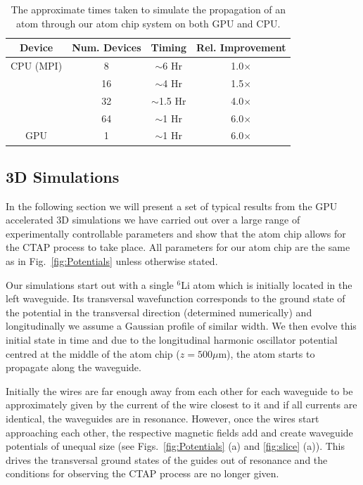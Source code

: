 \begin{table}[tb]
  \begin{center}
    \begin{tabular}{|c||c|c|c|}
      \hline
      Device & Num. Devices & Timing  & Rel. Improvement \\ \hline
      CPU (MPI) & 8 & $\sim$6 Hr & 1.0$\times$ \\
      & 16 & $\sim$4 Hr & 1.5$\times$ \\
      & 32 & $\sim$1.5 Hr & 4.0$\times$ \\
      & 64 & $\sim$1 Hr & 6.0$\times$ \\ \hline
      GPU & 1 & $\sim$1 Hr & 6.0$\times$ \\ \hline
    \end{tabular}
  \end{center}
   \caption{The approximate times taken to simulate the propagation of an atom through our atom chip system on both GPU and CPU.}
   \label{tbl:timing}
\end{table}


\subsection{3D Simulations}
\label{sec:Results}
In the following section we will present a set of typical results from the GPU accelerated 3D simulations we have carried out over a large range of experimentally controllable parameters and show that the atom chip allows for the CTAP process to take place. All parameters for our atom chip are the same as in Fig.~\ref{fig:Potentials} unless otherwise stated.

Our simulations start out with a single $^{6}$Li atom which is initially located in the left waveguide. Its transversal wavefunction corresponds to the ground state of the potential in the transversal direction (determined numerically) and longitudinally we assume a Gaussian profile of similar width. We then evolve this initial state in time and due to the longitudinal harmonic oscillator potential centred at the middle of the atom chip ($z=500 \mu$m), the atom starts to propagate along the waveguide.

Initially the wires are far enough away from each other for each waveguide to be approximately given by the current of the wire closest to it and if all currents are identical, the waveguides are in resonance. However, once the wires start approaching each other, the respective magnetic fields add and create waveguide potentials of unequal size (see Figs.~\ref{fig:Potentials} (a) and \ref{fig:slice} (a)). This drives the transversal ground states of the guides out of resonance and the conditions for observing the CTAP process are no longer given.

